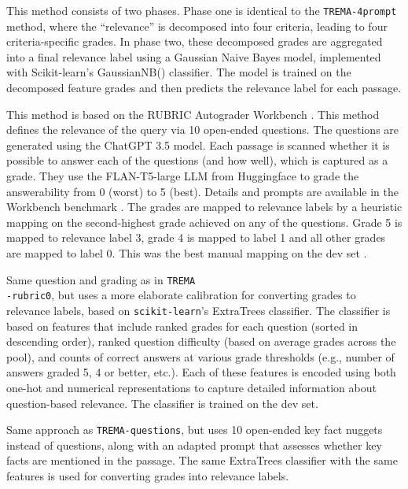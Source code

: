 This method consists of two phases. Phase one is identical to the \texttt{TREMA-4prompt} method, where the ``relevance'' is decomposed into four criteria, leading to four criteria-specific grades. In phase two, these decomposed grades are aggregated into a final relevance label using a Gaussian Naive Bayes model, implemented with Scikit-learn's GaussianNB() classifier. The model is trained on the decomposed feature grades and then predicts the relevance label for each passage.

This method is based on the RUBRIC Autograder Workbench \cite{dietz2024workbench}. This method defines the relevance of the query via 10 open-ended questions. The questions are generated using the ChatGPT 3.5 model. Each passage is scanned whether it is possible to answer each of the questions (and how well), which is captured as a grade. They use the FLAN-T5-large LLM from Huggingface to grade the answerability from 0 (worst) to 5 (best). Details and prompts are available in the Workbench benchmark \cite{dietz2024workbench}. The grades are mapped to relevance labels by a heuristic mapping on the second-highest grade achieved on any of the questions. Grade 5 is mapped to relevance label 3, grade 4 is mapped to label 1 and all other grades are mapped to label 0. This was the best manual mapping on the dev set \cite{farzi2024rubric}.

Same question and grading as in \texttt{TREMA\\-rubric0}, but uses a more elaborate calibration for converting grades to relevance labels, based on \texttt{scikit-learn}'s ExtraTrees classifier. The classifier is based on features that include ranked grades for each question (sorted in descending order), ranked question difficulty (based on average grades across the pool), and counts of correct answers at various grade thresholds (e.g., number of answers graded 5, 4 or better, etc.). Each of these features is encoded using both one-hot and numerical representations to capture detailed information about question-based relevance. The classifier is trained on the dev set.



Same approach as \texttt{TREMA-questions}, but uses 10 open-ended key fact nuggets instead of questions, along with an adapted prompt that assesses whether key facts are mentioned in the passage. The same ExtraTrees classifier with the same features is used for converting grades into relevance labels.

